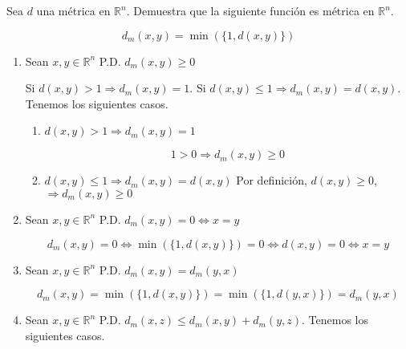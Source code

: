 \begin{eg}
Sea $d$ una métrica en $\mathbb{R}^{n}$. Demuestra que la siguiente función es métrica en $\mathbb{R}^{n}$.

\begin{equation*}
    {d}_{m}(x,y)=\min(\{1,d(x,y)\})
\end{equation*}

\end{eg}
\begin{proofexplanation}
    

\begin{enumerate}[label=(\subscript{D}{{\arabic*}})]
\item  Sean $x,y \in \mathbb{R}^{n}$ P.D. ${d}_{m}(x,y) \geqslant 0$

Si ${d}(x,y)>1 \Rightarrow {d}_{m}(x,y)=1$. Si  ${d}(x,y)\leqslant 1 \Rightarrow {d}_{m}(x,y)=d(x,y)$. Tenemos los siguientes casos.

\begin{enumerate}
    
\item  ${d}(x,y) > 1 \Rightarrow {d}_{m}(x,y)=1 $

\begin{equation*}
    1 > 0 \Rightarrow {d}_{m}(x,y) \geqslant 0
\end{equation*}

\item ${d}(x,y) \leqslant 1 \Rightarrow {d}_{m}(x,y)={d}(x,y) $ Por definición,  $d(x,y) \geqslant 0$, $\Rightarrow {d}_{m}(x,y)\geqslant 0$

\end{enumerate}

\item Sean $x,y \in \mathbb{R}^{n}$ P.D. ${d}_{m}(x,y) = 0 \Leftrightarrow x=y$

 \begin{equation*}
     {d}_{m}(x,y) = 0 \Leftrightarrow \min(\{1,d(x,y)\}) = 0 \Leftrightarrow d(x,y) = 0 \Leftrightarrow x=y
 \end{equation*}

\item   Sean $x,y \in \mathbb{R}^{n}$ P.D. ${d}_{m}(x,y) ={d}_{m}(y,x) $

\begin{equation*}
     {d}_{m}(x,y) = \min(\{1,d(x,y)\}) = \min(\{1,d(y,x)\}) = {d}_{m}(y,x)
\end{equation*}

\item  Sean $x,y \in \mathbb{R}^{n}$ P.D. ${d}_{m}(x,z) \leqslant {d}_{m}(x,y) +{d}_{m}(y,z)$. Tenemos los siguientes casos.


\end{enumerate}
\end{proofexplanation}
